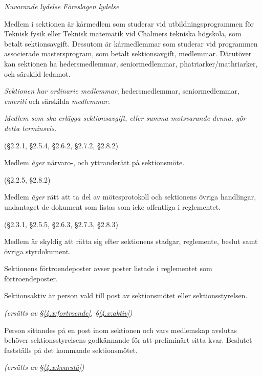 \documentclass{article}
\newenvironment{lydelse}
    {\begin{paracol}{2}%
        \emph{Nuvarande lydelse}%
        \switchcolumn%
        \emph{Föreslagen lydelse}%
    \end{paracol}%
    \begin{enumerate}[label=\thesubsection.\arabic*]%
    \begin{paracol}{2}%
    }{\end{paracol}\end{enumerate}}
\begin{document}
\begin{lydelse}
    \item Medlem i sektionen är kårmedlem som studerar vid utbildningsprogrammen för Teknisk fysik eller Teknisk matematik vid Chalmers tekniska högskola, som betalt sektionsavgift. Dessutom är kårmedlemmar som studerar vid programmen associerade mastersprogram, som betalt sektionsavgift, medlemmar. Därutöver kan sektionen ha hedersmedlemmar, seniormedlemmar, phatri\-arker/\-mathri\-arker, och särskild ledamot.
    
  \switchcolumn
  \setcounter{enumi}{0}
    \item \emph{Sektionen har ordinarie medlemmar}, hedersmedlemmar, seniormedlemmar, \emph{emeriti} och särskilda \emph{medlemmar}.
    
  \switchcolumn*
  \switchcolumn
    \item \emph{Medlem som ska erlägga sektionsavgift, eller summa motsvarande denna, gör detta terminsvis.}

  \switchcolumn*
    (\S 2.2.1, \S 2.5.4, \S 2.6.2, \S 2.7.2, \S 2.8.2)
  \switchcolumn
    \item Medlem \emph{äger} närvaro-, och yttranderätt på sektionsmöte.
      \label{2.1:närvaro}
    
  \switchcolumn*
    (\S 2.2.5, \S 2.8.2)
  \switchcolumn
    \item Medlem \emph{äger} rätt att ta del av mötesprotokoll och sektionens övriga handlingar, undantaget de dokument som listas som icke offentliga i reglementet.
      \label{2.1:offentlighet}
    
  \switchcolumn*
    (\S 2.3.1, \S 2.5.5, \S 2.6.3, \S 2.7.3, \S 2.8.3)

  \switchcolumn
    \item Medlem är skyldig att rätta sig efter sektionens stadgar, regle\-mente, beslut samt övriga styrdokument.
      \label{2.1:skyldig}
    
  \switchcolumn*
  \setcounter{subsection}{4}
  \setcounter{enumi}{0}
    \item Sektionens förtroendeposter avser poster listade i reglementet som förtroendeposter.
    
    \item Sektionsaktiv är person vald till post av sektionsmötet eller sektionsstyrelsen.
    
  \switchcolumn
    \emph{(ersätts av \S \ref{4.x:fortroende}, \S \ref{4.x:aktiv})}

  \switchcolumn*
  \setcounter{subsection}{1}
  \setcounter{enumi}{1}
    \item Person sittandes på en post inom sektionen och vars medlemskap avslutas behöver sektionsstyrelsens godkännande för att preliminärt sitta kvar.
    Beslutet fastställs på det kommande sektionsmötet.

  \switchcolumn
    \emph{(ersätts av \S\ref{4.x:kvarstå})} %
\end{lydelse}
\end{document}
